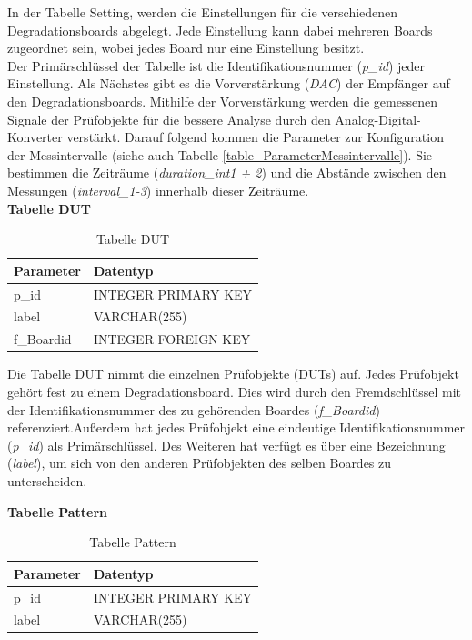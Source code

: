 In der Tabelle Setting, werden die Einstellungen  für die verschiedenen Degradationsboards abgelegt. Jede Einstellung kann dabei mehreren Boards zugeordnet sein, wobei jedes Board nur eine Einstellung besitzt.\\
Der Primärschlüssel der Tabelle ist die Identifikationsnummer (\textit{p\_id}) jeder Einstellung. Als Nächstes gibt es die Vorverstärkung (\textit{DAC}) der Empfänger auf den Degradationsboards. Mithilfe der Vorverstärkung werden die gemessenen Signale der Prüfobjekte für die bessere Analyse durch den Analog-Digital-Konverter verstärkt. Darauf folgend kommen die Parameter zur Konfiguration der Messintervalle (siehe auch Tabelle \ref{table_ParameterMessintervalle}). Sie bestimmen die Zeiträume (\textit{duration\_int1 + 2}) und die Abstände zwischen den Messungen (\textit{interval\_1-3}) innerhalb dieser Zeiträume.\\

\textbf{Tabelle DUT}\\

\begin{table}[H]
\begin{center}
\begin{tabular}{|l|l|}\hline
Parameter & Datentyp \\ \hline
p\_id & INTEGER PRIMARY KEY\\ 
label & VARCHAR(255)\\ 
f\_Boardid & INTEGER FOREIGN KEY\\ \hline
\end{tabular}
\caption{Tabelle DUT}
\label{table_TabelleDUT}
\end{center}
\end{table}

Die Tabelle DUT nimmt die einzelnen Prüfobjekte (\acp{DUT}) auf. Jedes Prüfobjekt gehört fest zu einem Degradationsboard. Dies wird durch den Fremdschlüssel mit der Identifikationsnummer des zu gehörenden Boardes (\textit{f\_Boardid}) referenziert.Außerdem hat jedes Prüfobjekt eine eindeutige Identifikationsnummer (\textit{p\_id}) als Primärschlüssel. Des Weiteren hat verfügt es über eine Bezeichnung (\textit{label}), um sich von den anderen Prüfobjekten des selben Boardes zu unterscheiden.



\textbf{Tabelle Pattern}\\

\begin{table}[H]
\begin{center}
\begin{tabular}{|l|l|}\hline
Parameter & Datentyp \\ \hline
p\_id & INTEGER PRIMARY KEY\\ 
label & VARCHAR(255)\\ \hline
\end{tabular}
\caption{Tabelle Pattern}
\label{table_TabellePattern}
\end{center}
\end{table}

